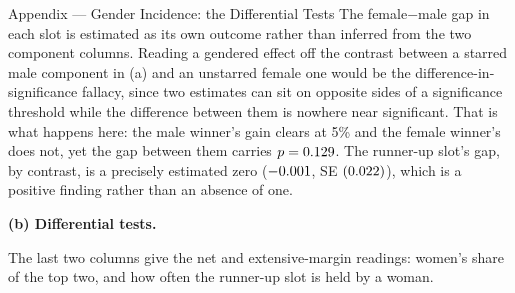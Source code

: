
\begin{frame}{Appendix --- Gender Incidence: the Differential Tests}
\hypertarget{app:gendergap}{}
\scriptsize
The female$-$male gap in each slot is estimated as its own outcome rather than inferred from the two component columns. Reading a gendered effect off the contrast between a starred male component in (a) and an unstarred female one would be the difference-in-significance fallacy, since two estimates can sit on opposite sides of a significance threshold while the difference between them is nowhere near significant. That is what happens here: the male winner's gain clears at 5\% and the female winner's does not, yet the gap between them carries $p=0.129$. The runner-up slot's gap, by contrast, is a precisely estimated zero ($-0.001$, SE $(0.022)$), which is a positive finding rather than an absence of one.

\medskip
\textbf{(b) Differential tests.}
\begin{center}
\resizebox{\linewidth}{!}{}
\end{center}
\medskip
\footnotesize The last two columns give the net and extensive-margin readings: women's share of the top two, and how often the runner-up slot is held by a woman.
\hfill\hyperlink{app:gender}{}\,\hyperlink{src:gender}{}
\end{frame}
